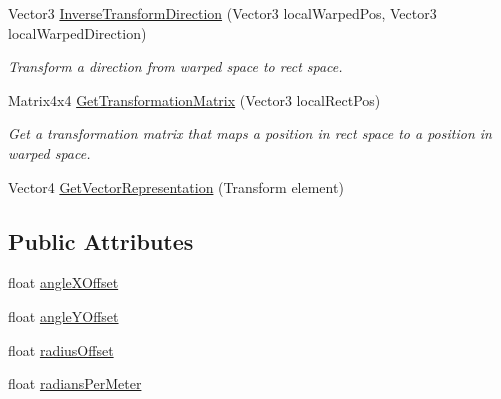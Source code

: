 \begin{DoxyCompactItemize}
Vector3 \mbox{\hyperlink{class_leap_1_1_unity_1_1_space_1_1_leap_spherical_space_1_1_transformer_ac82a933f2e7851ccc455b11dd789dd87}{Inverse\+Transform\+Direction}} (Vector3 local\+Warped\+Pos, Vector3 local\+Warped\+Direction)
\begin{DoxyCompactList}\small\item\em Transform a direction from warped space to rect space. \end{DoxyCompactList}\item 
Matrix4x4 \mbox{\hyperlink{class_leap_1_1_unity_1_1_space_1_1_leap_spherical_space_1_1_transformer_aad315845425b24d3b09c62c49a7093ca}{Get\+Transformation\+Matrix}} (Vector3 local\+Rect\+Pos)
\begin{DoxyCompactList}\small\item\em Get a transformation matrix that maps a position in rect space to a position in warped space. \end{DoxyCompactList}\item 
Vector4 \mbox{\hyperlink{class_leap_1_1_unity_1_1_space_1_1_leap_spherical_space_1_1_transformer_ab2e6a163514c332db4c662754f37f385}{Get\+Vector\+Representation}} (Transform element)
\end{DoxyCompactItemize}
\subsection*{Public Attributes}
\begin{DoxyCompactItemize}
\item 
float \mbox{\hyperlink{class_leap_1_1_unity_1_1_space_1_1_leap_spherical_space_1_1_transformer_a684fd7c7ecc889797e438534a4efc7b7}{angle\+X\+Offset}}
\item 
float \mbox{\hyperlink{class_leap_1_1_unity_1_1_space_1_1_leap_spherical_space_1_1_transformer_ae9953d013faee31cc40c76d377620479}{angle\+Y\+Offset}}
\item 
float \mbox{\hyperlink{class_leap_1_1_unity_1_1_space_1_1_leap_spherical_space_1_1_transformer_a526e6fe0a6a2ec93359ec446b9707b3c}{radius\+Offset}}
\item 
float \mbox{\hyperlink{class_leap_1_1_unity_1_1_space_1_1_leap_spherical_space_1_1_transformer_a01ab122f08461f13f4f1c03d10f99bce}{radians\+Per\+Meter}}
\end{DoxyCompactItemize}

